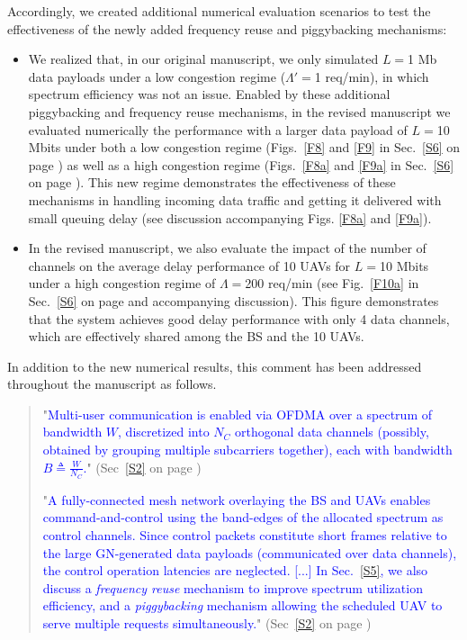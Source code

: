 \documentclass[12pt, draftcls, onecolumn]{IEEEtran}
\theoremstyle{plain}
\theoremstyle{definition}
\theoremstyle{remark}
\newcommand\hlt[1]{\textcolor{blue}{#1}}
\begin{document}
\begin{enumerate}
    
Accordingly, we created additional numerical evaluation scenarios to test the effectiveness of the newly added frequency reuse and piggybacking mechanisms:
\begin{itemize}
    \item 
We realized that, in our original manuscript, we only simulated $L{=}$1 Mb data payloads under a low congestion regime ($\Lambda'{=}$1 req/min), in which spectrum efficiency was not an issue.
Enabled by these additional piggybacking and frequency reuse mechanisms, in the revised
manuscript we evaluated numerically  the performance with a larger data payload 
 of $L{=}$10 Mbits under both a low congestion regime (Figs.~\ref{F8} and \ref{F9} in Sec.~\ref{S6} on page \pageref{F8}) as well as a high congestion regime (Figs.~\ref{F8a} and \ref{F9a} in Sec.~\ref{S6} on page \pageref{F8a}).
 This new regime demonstrates the effectiveness of these mechanisms in handling incoming data traffic and getting it delivered with small queuing delay (see discussion accompanying Figs. \ref{F8a} and \ref{F9a}).
\item
In the revised manuscript, we also evaluate
the impact of the number of channels on the average delay performance of 10 UAVs for $L{=}$10 Mbits under a high congestion regime of $\Lambda{=}$200 req/min (see Fig.~\ref{F10a} in Sec.~\ref{S6} on page \pageref{F10a} and accompanying discussion). 
This figure demonstrates that the system achieves good delay performance with only 4 data channels, which are effectively shared among the BS and the 10 UAVs.
\end{itemize}

In addition to the new numerical results,    this comment has been addressed throughout the manuscript as follows.
    \begin{quote}
        "\hlt{Multi-user communication is enabled via OFDMA over a spectrum of bandwidth $W$, discretized into $N_{C}$ orthogonal data channels (possibly, obtained by grouping multiple subcarriers together), each with bandwidth $B{\triangleq}\frac{W}{N_{C}}$.}" (Sec~\ref{S2} on page \pageref{S2})
        \vspace{1mm}
        
        "\hlt{A fully-connected mesh network overlaying the BS and UAVs enables command-and-control using the band-edges of the allocated spectrum as control channels. Since control packets constitute short frames relative to the large GN-generated data payloads (communicated over data channels), the control operation latencies are neglected. [...] In Sec.~\ref{S5}, we also discuss a \emph{frequency reuse} mechanism to improve spectrum utilization efficiency, and a \emph{piggybacking} mechanism allowing the scheduled UAV to serve multiple requests simultaneously.}" (Sec~\ref{S2} on page \pageref{comm_model_label})
        \vspace{1mm}
        

\end{quote}
\end{enumerate}
\end{document}
